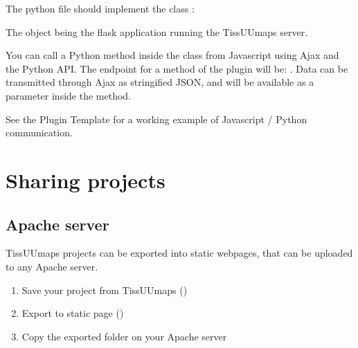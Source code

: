 \documentclass[letterpaper,10pt,english,openany,oneside]{sphinxmanual}
\begin{document}
\sphinxAtStartPar
The python file should implement the class :

\begin{sphinxVerbatim}[commandchars=\\\{\}]
  
      
          
\end{sphinxVerbatim}

\sphinxAtStartPar
The  object being the flask application running the TissUUmaps server.

\sphinxAtStartPar
You can call a Python method inside the  class from Javascript using Ajax and the Python API. The endpoint for a method  of the plugin  will be: . Data can be transmitted through Ajax as stringified JSON, and will be available as a parameter inside the method.

\sphinxAtStartPar
See the Plugin Template for a working example of Javascript / Python communication.

\sphinxstepscope


\chapter{Sharing projects}
\label{\detokenize{docs/sharing/index:sharing-projects}}\label{\detokenize{docs/sharing/index::doc}}
\sphinxstepscope


\section{Apache server}
\label{\detokenize{docs/sharing/apache:apache-server}}\label{\detokenize{docs/sharing/apache::doc}}
\sphinxAtStartPar
TissUUmaps projects can be exported into static webpages, that can be uploaded to any Apache server.
\begin{enumerate}
%
\item {} 
\sphinxAtStartPar
Save your project from TissUUmaps ()

\item {} 
\sphinxAtStartPar
Export to static page ()

\item {} 
\sphinxAtStartPar
Copy the exported folder on your Apache server

\end{enumerate}
\end{document}
